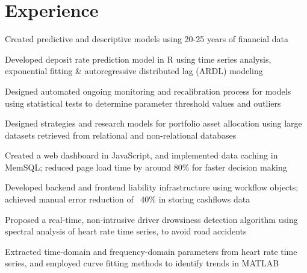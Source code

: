 \documentclass[]{deedy-resume-openfont}
\begin{document}
\begin{minipage}[t]{0.66\textwidth} 


\section{Experience}

\vspace{\topsep} %
\begin{tightemize}
\item Created predictive and descriptive models using 20-25 years of financial data
\item Developed deposit rate prediction model in R using time series analysis, exponential fitting \& autoregressive distributed lag (ARDL) modeling
\item Designed automated ongoing monitoring and recalibration process for models using statistical tests to determine parameter threshold values and outliers
\end{tightemize}
\sectionsep

\begin{tightemize}
\item Designed strategies and research models for portfolio asset allocation using large datasets retrieved from relational and non-relational databases 
\item Created a web dashboard in JavaScript, and implemented data caching in MemSQL; reduced page load time by around 80\% for faster decision making 
\item Developed backend and frontend liability infrastructure using workflow objects; achieved manual error reduction of ~40\% in storing cashflows data
\end{tightemize}
\sectionsep

\begin{tightemize}
\item Proposed a real-time, non-intrusive driver drowsiness detection algorithm using spectral analysis of heart rate time series, to avoid road accidents
\item Extracted time-domain and frequency-domain parameters from heart rate time series, and employed curve fitting methods to identify trends in MATLAB


\end{tightemize}
\end{minipage}
\end{document}
